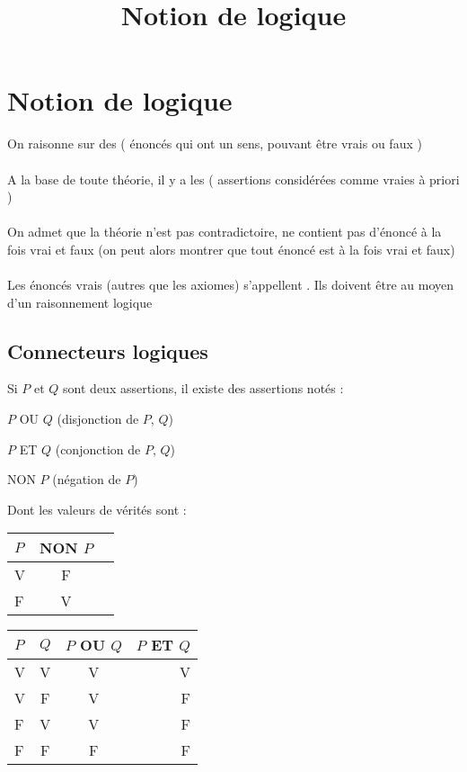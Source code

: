 \documentclass[12pt, a4paper]{report}
\title{Notion de logique}
\begin{document}
\chapter{Notion de logique}


\begin{remarque}[Introduction]
On raisonne sur des  ( énoncés qui ont un sens, pouvant être vrais ou faux )\\
\\
A la base de toute théorie, il y a les  ( assertions considérées comme vraies à priori )\\
\\
On admet que la théorie n'est pas contradictoire, \ie ne contient pas d'énoncé à la fois vrai et faux (on peut alors montrer que tout énoncé est à la fois vrai et faux)\\
\\
Les énoncés vrais (autres que les axiomes) s'appellent . Ils doivent être  au moyen d'un raisonnement logique
\end{remarque}

\section{Connecteurs logiques}
Si $P$ et $Q$ sont deux assertions, il existe des assertions notés :
\begin{itemize}
\begin{multicols}{2}
    \item $P$ OU $Q$ (disjonction de $P$, $Q$)
    \item $P$ ET $Q$ (conjonction de $P$, $Q$)
    \item NON $P$ (négation de $P$)
\end{multicols}
\end{itemize}
\par Dont les valeurs de vérités sont :
\begin{itemize}
\begin{multicols}{2}
\item \begin{tabular}{|l|c|r|}
      \hline
      $P$ & NON $P$   \\
      \hline
      V & F \\
      \hline
      F & V \\
      \hline
     \end{tabular}
\item \begin{tabular}{|l|c|c|r|}
      \hline
      $P$ & $Q$ & $P$ OU $Q$ & $P$ ET $Q$ \\
      \hline
      V & V & V & V \\
      \hline
      V & F & V & F\\
      \hline
      F & V & V & F\\
      \hline
      F & F & F & F \\
      \hline
      \end{tabular}
\end{multicols}
\end{itemize}
\end{document}
